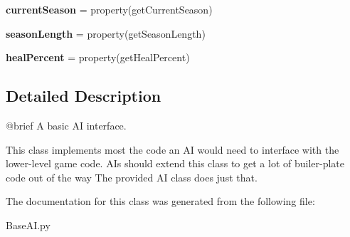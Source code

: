 \begin{DoxyCompactItemize}
\item 
\hypertarget{classBaseAI_1_1BaseAI_a03557f159d9ff6d5add8635d0b23be93}{{\bfseries current\-Season} = property(get\-Current\-Season)}\label{classBaseAI_1_1BaseAI_a03557f159d9ff6d5add8635d0b23be93}

\item 
\hypertarget{classBaseAI_1_1BaseAI_a2746a2a7d85a31805c8496eef0bf88db}{{\bfseries season\-Length} = property(get\-Season\-Length)}\label{classBaseAI_1_1BaseAI_a2746a2a7d85a31805c8496eef0bf88db}

\item 
\hypertarget{classBaseAI_1_1BaseAI_aadf087c11fcf8a6f13a2113bd0647c6b}{{\bfseries heal\-Percent} = property(get\-Heal\-Percent)}\label{classBaseAI_1_1BaseAI_aadf087c11fcf8a6f13a2113bd0647c6b}

\end{DoxyCompactItemize}


\subsection{\-Detailed \-Description}
\begin{DoxyVerb}@brief A basic AI interface.

This class implements most the code an AI would need to interface with the lower-level game code.
AIs should extend this class to get a lot of builer-plate code out of the way
The provided AI class does just that.
\end{DoxyVerb}
 

\-The documentation for this class was generated from the following file\-:\begin{DoxyCompactItemize}
\item 
\-Base\-A\-I.\-py\end{DoxyCompactItemize}
